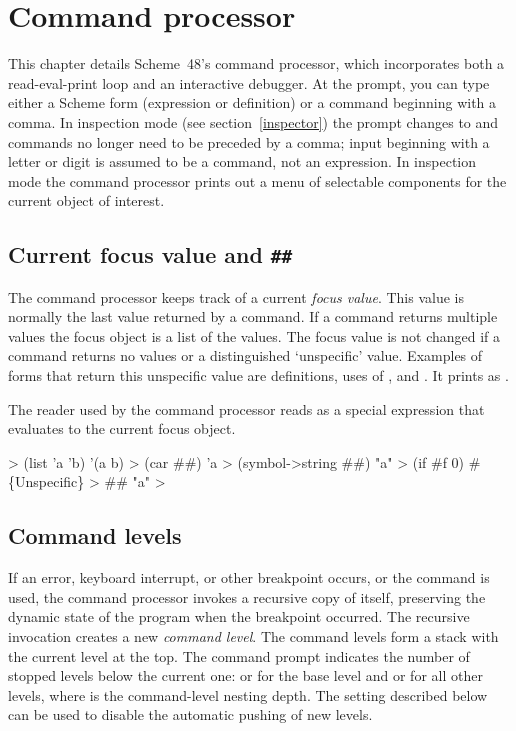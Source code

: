 \chapter{Command processor}
\label{chapter:command-processor}

This chapter details Scheme~48's command processor, which incorporates
 both a read-eval-print loop and an interactive debugger.
At the \code{>} prompt, you can type either a Scheme form
 (expression or definition) or a command beginning with a comma.
In
inspection mode (see section~\ref{inspector})
 the prompt changes to \code{:} and commands
 no longer need to be preceded by a comma; input beginning with
 a letter or digit is assumed to be a command, not an expression.
In inspection mode the command processor prints out a
 menu of selectable components for the current object of interest.

\section{Current focus value and {\tt \#\#}}

The command processor keeps track of a current {\em focus value}.
This value is normally the last value returned by a command.
If a command returns multiple values the focus object is a list of the
 values.
The focus value is not changed if a command returns no values or 
 a distinguished `unspecific' value.
Examples of forms that return this unspecific value are definitions,
 uses of , and .
It prints as .

The reader used by the command processor reads \code{\#\#} as a special
 expression that evaluates to the current focus object.
\begin{example}
> (list 'a 'b)
'(a b)
> (car ##)
'a
> (symbol->string ##)
"a"
> (if #f 0)
#\{Unspecific\}
> ##
"a"
> 
\end{example}

\section{Command levels}

If an error, keyboard interrupt, or other breakpoint occurs, or the
  command is used, the command
 processor invokes a recursive copy of itself, preserving the dynamic state of
 the program when the breakpoint occurred.
The recursive invocation creates a new {\em command level}.
The command levels form a stack with the current level at the top.
The command prompt indicates the number of stopped levels below the
 current one: \code{>} or \code{:} for the
 base level and  or  for all other levels,
 where  is the command-level nesting depth.
The  setting
 described below can be used to disable the automatic pushing of new levels.

